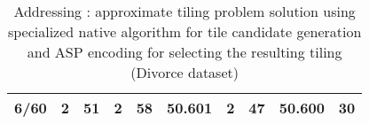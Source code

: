 \begin{table}[]
\begin{tabular}{rrrrrrrrrr}
6/60                                           & 2                                       & 51                                          & 2                      & 58                         & 50.601                    & 2                                           & 47                                              & 50.600                                         & 30                          \\ \hline                         
\end{tabular}
\caption{Addressing \qsix: approximate tiling problem  solution using specialized native algorithm for tile candidate generation and ASP encoding for selecting the resulting tiling (Divorce dataset)}
\label{til:div}
\normalsize
\end{table}


